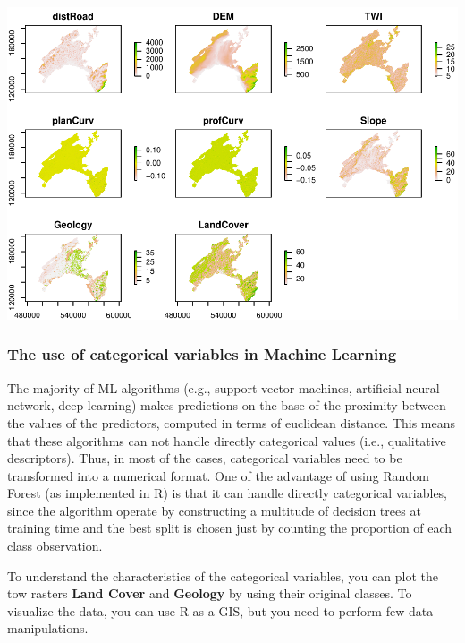 \documentclass[
]{book}
\begin{document}
\includegraphics{06-RF_files/figure-latex/stack-feature-1.pdf}

\hypertarget{the-use-of-categorical-variables-in-machine-learning}{%
\subsubsection{The use of categorical variables in Machine Learning}\label{the-use-of-categorical-variables-in-machine-learning}}

The majority of ML algorithms (e.g., support vector machines, artificial neural network, deep learning) makes predictions on the base of the proximity between the values of the predictors, computed in terms of euclidean distance.
This means that these algorithms can not handle directly categorical values (i.e., qualitative descriptors).
Thus, in most of the cases, categorical variables need to be transformed into a numerical format.
One of the advantage of using Random Forest (as implemented in R) is that it can handle directly categorical variables, since the algorithm operate by constructing a multitude of decision trees at training time and the best split is chosen just by counting the proportion of each class observation.

To understand the characteristics of the categorical variables, you can plot the tow rasters \textbf{Land Cover} and \textbf{Geology} by using their original classes.
To visualize the data, you can use R as a GIS, but you need to perform few data manipulations.
\end{document}
